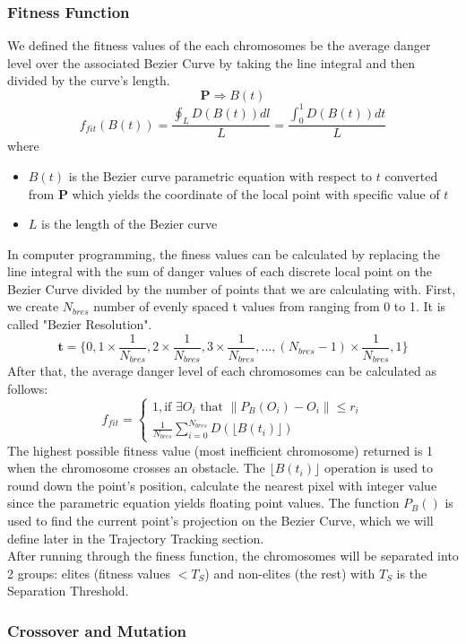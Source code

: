   \subsubsection{Fitness Function}
  We defined the fitness values of the each chromosomes be the average danger level over the associated Bezier Curve by taking the line integral and then divided by the curve's length.
  $$\mathbf{P}\Rightarrow B(t)$$
  $$f_{fit}(B(t))=\frac{\oint_LD(B(t))dl}{L}=\frac{\int_0^1D(B(t))dt}{L}$$
  where
  \begin{itemize}
    \item $B(t)$ is the Bezier curve parametric equation with respect to $t$ converted from $\mathbf{P}$ which yields the coordinate of the local point with specific value of $t$
    \item $L$ is the length of the Bezier curve
  \end{itemize}
  In computer programming, the finess values can be calculated by replacing the line integral with the sum of danger values of each discrete local point on the Bezier Curve divided by the number of points that we are calculating with.
  First, we create $N_{bres}$ number of evenly spaced t values from ranging from 0 to 1. It is called "Bezier Resolution".
  $$\mathbf{t}=\{0, 1\times\frac{1}{N_{bres}}, 2\times\frac{1}{N_{bres}}, 3\times\frac{1}{N_{bres}},..., (N_{bres}-1)\times\frac{1}{N_{bres}},1\}$$
  After that, the average danger level of each chromosomes can be calculated as follows:
  $$
  f_{fit}=
  \begin{cases} 
    1,  \text{if } \exists O_i \text{ that } \left\lVert P_B(O_i) - O_i \right\rVert \leq r_i \\
    \frac{1}{N_{bres}}\sum_{i=0}^{N_{bres}}D(\lfloor B(t_i) \rfloor)
  \end{cases}
  $$
  The highest possible fitness value (most inefficient chromosome) returned is 1 when the chromosome crosses an obstacle.
  The $\lfloor B(t_i) \rfloor$ operation is used to round down the point's position, calculate the nearest pixel with integer value since the parametric equation yields floating point values.
  The function $P_B()$ is used to find the current point's projection on the Bezier Curve, which we will define later in the Trajectory Tracking section.\\
  After running through the finess function, the chromosomes will be separated into 2 groups: elites (fitness values $< T_S$) and non-elites (the rest) with $T_S$ is the Separation Threshold.
  
  \subsubsection{Crossover and Mutation}
